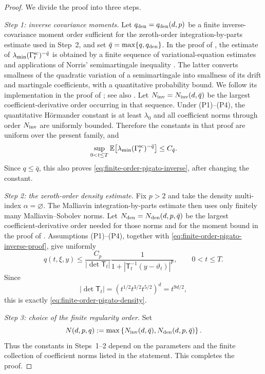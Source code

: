 \documentclass[11pt]{article}
\numberwithin{equation}{section}
\theoremstyle{plain}
\theoremstyle{definition}
\theoremstyle{remark}
\newcommand{\E}{\mathbb E}
\begin{document}
\begin{proof}
We divide the proof into three steps.

\emph{Step 1: inverse covariance moments.}
Let $q_{\rm den}=q_{\rm den}(d,p)$ be a finite inverse-covariance moment order
sufficient for the zeroth-order integration-by-parts estimate used in Step~2,
and set $\bar q=\max\{q,q_{\rm den}\}$.  In the proof of
\cite[Lemma~3.5]{Pigato2022}, the estimate of
$\lambda_{\min}(\Gamma_t^{\rm sc})^{-\bar q}$ is obtained by a finite sequence
of variational-equation estimates and applications of Norris'
semimartingale inequality \cite[Lemma~4.1]{Norris1986}.
The latter converts smallness of the quadratic variation of a semimartingale
into smallness of its drift and martingale coefficients, with a quantitative
probability bound.  We follow its implementation in the proof of
\cite[Lemma~3.5]{Pigato2022}; see also \cite[Section~2.3]{Nualart2006}.
Let
$N_{\rm inv}=N_{\rm inv}(d,\bar q)$ be the largest coefficient-derivative
order occurring in that sequence.  Under \textup{(P1)}--\textup{(P4)}, the
quantitative H\"ormander constant is at least $\lambda_0$ and all coefficient
norms through order $N_{\rm inv}$ are uniformly bounded.  Therefore the
constants in that proof are uniform over the present family, and
\begin{equation}
\label{eq:finite-order-pigato-inverse-proof}
\sup_{0<t\le T}\E\!\left[
\lambda_{\min}(\Gamma_t^{\rm sc})^{-\bar q}\right]
\le C_{\bar q}.
\end{equation}
Since $q\le\bar q$, this also proves
\eqref{eq:finite-order-pigato-inverse}, after changing the constant.

\emph{Step 2: the zeroth-order density estimate.}
Fix $p>2$ and take the density multi-index $\alpha=\varnothing$.
The Malliavin integration-by-parts estimate
\cite[Appendix~A, Lemma~A.1]{Pigato2022} then uses only finitely many
Malliavin--Sobolev norms.  Let
$N_{\rm den}=N_{\rm den}(d,p,\bar q)$ be the largest
coefficient-derivative order needed for those norms and for the moment bound
in the proof of \cite[Theorem~2.1(i)]{Pigato2022}.  Assumptions
\textup{(P1)}--\textup{(P4)}, together with
\eqref{eq:finite-order-pigato-inverse-proof}, give uniformly
\[
q(t,\xi,y)
\le
\frac{C_p}{|\det\mathsf T_t|}
\frac{1}{1+|\mathsf T_t^{-1}(y-\vartheta_t)|^p},
\qquad 0<t\le T.
\]
Since
\[
|\det\mathsf T_t|
=\left(t^{1/2}t^{3/2}t^{5/2}\right)^d=t^{9d/2},
\]
this is exactly \eqref{eq:finite-order-pigato-density}.

\emph{Step 3: choice of the finite regularity order.}
Set
\[
N(d,p,q):=
\max\left\{N_{\rm inv}(d,\bar q),N_{\rm den}(d,p,\bar q)\right\}.
\]
Thus the constants in Steps~1--2 depend on the parameters and the finite
collection of coefficient norms listed in the statement.  This completes the
proof.
\end{proof}
\end{document}
